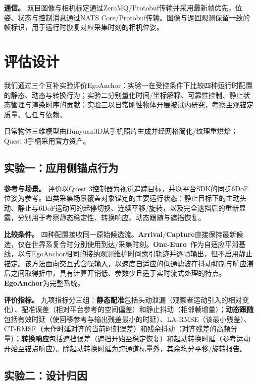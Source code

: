 \documentclass[review]{vgtc}
\begin{document}
\textbf{通信。}
双目图像与相机标定通过ZeroMQ/Protobuf传输并采用最新帧优先，位姿、状态与控制消息通过NATS Core/Protobuf传输。图像与返回观测保留一致的帧标识，用于运行时恢复对应采集时刻的相机位姿。

\section{评估设计}\label{sec:evaluation}
我们通过三个互补实验评价EgoAnchor：实验一在受控条件下比较四种运行时配置的静态、动态与转换行为；实验二分别量化时间/坐标解释、可靠性控制、静止状态管理与渲染时序的贡献；实验三以日常刚性物体开展被试内研究，考察主观锚定质量、信任与依赖。

日常物体三维模型由Hunyuan3D从手机照片生成并经网格简化/纹理重烘焙；Quest 3手柄采用官方资产。

\subsection{实验一：应用侧锚点行为}\label{sec:exp1-design}

\textbf{参考与场景。}
评价以Quest 3控制器为视觉追踪目标，并以平台SDK的同步6DoF位姿为参考。四类采集场景覆盖对象锚定的主要运行状态：静止目标下的主动头动、静止与6DoF运动间的起停切换、连续平移/旋转，以及完全遮挡后的重新显露，分别用于考察静态稳定性、转换响应、动态跟随与遮挡恢复。

\textbf{比较条件。}
四种配置接收同一原始候选流。\textbf{Arrival}/\textbf{Capture}直接保持最新候选，仅在世界系复合时分别使用到达/采集时刻。\textbf{One-Euro}~\cite{casiez2012oneeuro}作为自适应平滑基线，以与EgoAnchor相同的接纳观测维护时间索引轨迹并逐帧输出，但不启用静止锚定。该方法面向交互式含噪输入，以速度自适应的低通滤波在抖动抑制与响应滞后之间取得折中，具有计算开销低、参数少且适于实时流式处理的特点。\textbf{EgoAnchor}为完整系统。

\textbf{评价指标。}
九项指标分三组：\textbf{静态配准}包括头动泄漏（观察者运动引入的相对变化）、配准误差（相对平台参考的空间偏差）和静止抖动（相邻帧增量）；\textbf{动态跟随}包括有效时延（使回移参考与输出残差最小的时延）、LA-RMSE（该最小残差）、CT-RMSE（未作时延对齐的当前时刻误差）和残余抖动（对齐残差的高频分量）；\textbf{转换响应}包括遮挡误差（遮挡开始至稳定恢复）和起动转换时延（参考运动开始至锚点响应）。除起动转换时延为跨通道标量外，其余均分平移/旋转报告。

\subsection{实验二：设计归因}\label{sec:exp2-design}
\end{document}
